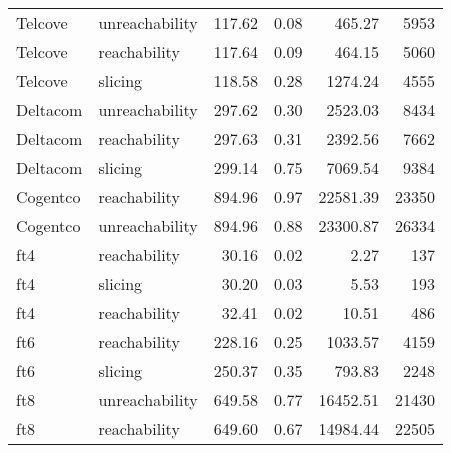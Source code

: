 \begin{tabular}{llrrrr}
Telcove & unreachability & 117.62 & 0.08 & 465.27 & 5953 \\
Telcove & reachability & 117.64 & 0.09 & 464.15 & 5060 \\
Telcove & slicing & 118.58 & 0.28 & 1274.24 & 4555 \\
Deltacom & unreachability & 297.62 & 0.30 & 2523.03 & 8434 \\
Deltacom & reachability & 297.63 & 0.31 & 2392.56 & 7662 \\
Deltacom & slicing & 299.14 & 0.75 & 7069.54 & 9384 \\
Cogentco & reachability & 894.96 & 0.97 & 22581.39 & 23350 \\
Cogentco & unreachability & 894.96 & 0.88 & 23300.87 & 26334 \\
ft4 & reachability & 30.16 & 0.02 & 2.27 & 137 \\
ft4 & slicing & 30.20 & 0.03 & 5.53 & 193 \\
ft4 & reachability & 32.41 & 0.02 & 10.51 & 486 \\
ft6 & reachability & 228.16 & 0.25 & 1033.57 & 4159 \\
ft6 & slicing & 250.37 & 0.35 & 793.83 & 2248 \\
ft8 & unreachability & 649.58 & 0.77 & 16452.51 & 21430 \\
ft8 & reachability & 649.60 & 0.67 & 14984.44 & 22505 \\
\bottomrule
\end{tabular}
